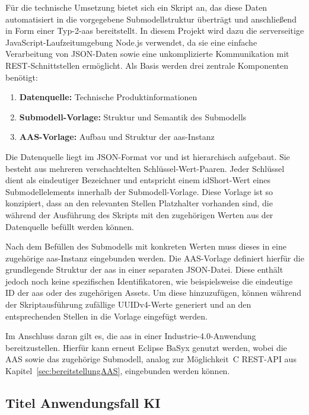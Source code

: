 Für die technische Umsetzung bietet sich ein Skript an, das diese Daten automatisiert in die vorgegebene Submodellstruktur überträgt und anschließend in Form einer Typ-2-\acs{aas} bereitstellt.
In diesem Projekt wird dazu die serverseitige JavaScript-Laufzeitumgebung Node.js \cite{nodejs} verwendet, da sie eine einfache Verarbeitung von JSON-Daten sowie eine unkomplizierte Kommunikation mit REST-Schnittstellen ermöglicht. 
Als Basis werden drei zentrale Komponenten benötigt:

\begin{enumerate}[noitemsep, leftmargin=*, label=\textbf{\arabic*.}]
    \item \textbf{Datenquelle:} Technische Produktinformationen
    \item \textbf{Submodell-Vorlage:} Struktur und Semantik des Submodells
    \item \textbf{AAS-Vorlage:} Aufbau und Struktur der \acs{aas}-Instanz
\end{enumerate}

Die Datenquelle liegt im JSON-Format vor und ist hierarchisch aufgebaut.
Sie besteht aus mehreren verschachtelten Schlüssel-Wert-Paaren.
Jeder Schlüssel dient als eindeutiger Bezeichner und entspricht einem idShort-Wert eines Submodellelements innerhalb der Submodell-Vorlage.
Diese Vorlage ist so konzipiert, dass an den relevanten Stellen Platzhalter vorhanden sind, die während der Ausführung des Skripts mit den zugehörigen Werten aus der Datenquelle befüllt werden können.

Nach dem Befüllen des Submodells mit konkreten Werten muss dieses in eine zugehörige \acs{aas}-Instanz eingebunden werden. 
Die AAS-Vorlage definiert hierfür die grundlegende Struktur der \acs{aas} in einer separaten JSON-Datei. 
Diese enthält jedoch noch keine spezifischen Identifikatoren, wie beispielsweise die eindeutige ID der \acs{aas} oder des zugehörigen Assets. 
Um diese hinzuzufügen, können während der Skriptausführung zufällige UUIDv4-Werte generiert und an den entsprechenden Stellen in die Vorlage eingefügt werden.

Im Anschluss daran gilt es, die \acs{aas} in einer Industrie-4.0-Anwendung bereitzustellen. 
Hierfür kann erneut Eclipse BaSyx genutzt werden, wobei die AAS sowie das zugehörige Submodell, analog zur Möglichkeit~C REST-API aus Kapitel~\ref{sec:bereitstellungAAS}, eingebunden werden können.

\subsection{Titel Anwendungsfall KI}

